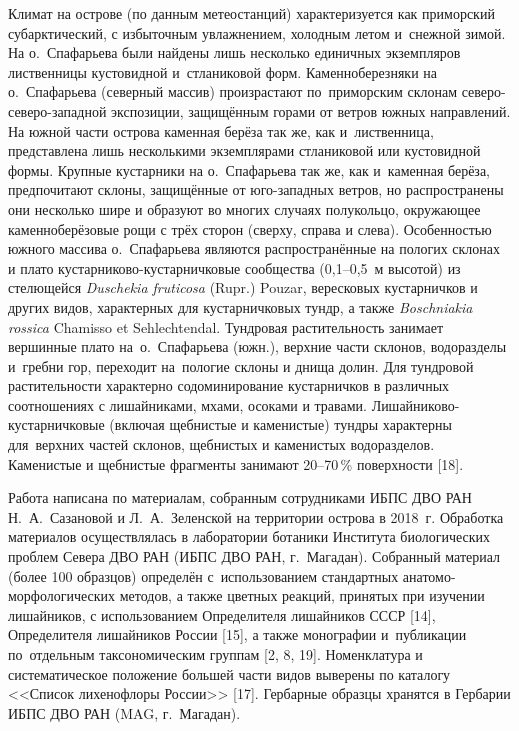 Климат на острове (по данным метеостанций) характеризуется как приморский субарктический, с избыточным увлажнением, холодным летом и~снежной зимой. На о.~Спафарьева были найдены лишь несколько единичных экземпляров лиственницы кустовидной и~стланиковой форм. Каменноберезняки на о.~Спафарьева (северный массив) произрастают по~приморским склонам северо-северо-западной экспозиции, защищённым горами от ветров южных направлений. На южной части острова каменная берёза так же, как и~лиственница, представлена лишь несколькими экземплярами стланиковой или кустовидной формы. Крупные кустарники на о.~Спафарьева так же, как и~каменная берёза, предпочитают склоны, защищённые от юго-западных ветров, но распространены они несколько шире и образуют во многих случаях полукольцо, окружающее каменноберёзовые рощи с трёх сторон (сверху, справа и слева). Особенностью южного массива о.~Спафарьева являются распространённые на пологих склонах и плато кустарниково-кустарничковые сообщества (0,1--0,5~м высотой) из стелющейся \textit{Duschekia fruticosa} (Rupr.) Pouzar, вересковых кустарничков и других видов, характерных для кустарничковых тундр, а также \textit{Boschniakia rossica} Chamisso et Sehlechtendal. Тундровая растительность занимает вершинные плато на~о.~Спафарьева (южн.), верхние части склонов, водоразделы и~гребни гор, переходит на~пологие склоны и днища долин. Для тундровой растительности характерно содоминирование кустарничков в различных соотношениях с лишайниками, мхами, осоками и травами. Лишайниково-кустарничковые (включая щебнистые и каменистые) тундры характерны для~верхних частей склонов, щебнистых и каменистых водоразделов. Каменистые и щебнистые фрагменты занимают 20--70\,\% поверхности [18].
\clearpage



Работа написана по материалам, собранным сотрудниками ИБПС ДВО РАН Н.~А.~Сазановой и Л.~А.~Зеленской на территории острова в 2018~г. Обработка материалов осуществлялась в лаборатории ботаники Института биологических проблем Севера ДВО РАН (ИБПС ДВО РАН, г.~Магадан). Собранный материал (более 100 образцов) определён с~использованием стандартных анатомо-морфологических методов, а также цветных реакций, принятых при изучении лишайников, с использованием Определителя лишайников СССР [14], Определителя лишайников России [15], а также монографии и~публикации по~отдельным таксономическим группам [2, 8, 19]. Номенклатура и систематическое положение большей части видов выверены по каталогу <<Список лихенофлоры России>> [17]. Гербарные образцы хранятся в Гербарии ИБПС ДВО РАН (MAG, г.~Магадан).

